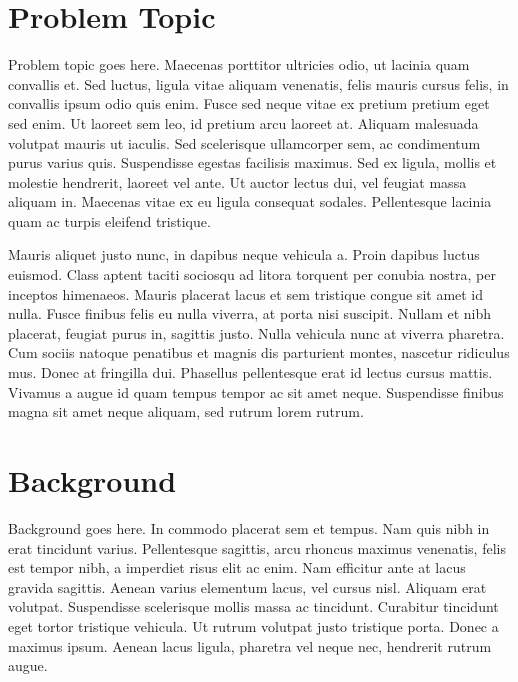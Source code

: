 \documentclass[letterpaper]{kuthesis}
\begin{document}
\section{Problem Topic}
Problem topic goes here. \cite{google}  Maecenas porttitor ultricies odio, ut lacinia quam convallis et. Sed luctus, ligula vitae aliquam venenatis, felis mauris cursus felis, in convallis ipsum odio quis enim. Fusce sed neque vitae ex pretium pretium eget sed enim. Ut laoreet sem leo, id pretium arcu laoreet at. Aliquam malesuada volutpat mauris ut iaculis. Sed scelerisque ullamcorper sem, ac condimentum purus varius quis. Suspendisse egestas facilisis maximus. Sed ex ligula, mollis et molestie hendrerit, laoreet vel ante. Ut auctor lectus dui, vel feugiat massa aliquam in. Maecenas vitae ex eu ligula consequat sodales. Pellentesque lacinia quam ac turpis eleifend tristique.
\par Mauris aliquet justo nunc, in dapibus neque vehicula a. Proin dapibus luctus euismod. Class aptent taciti sociosqu ad litora torquent per conubia nostra, per inceptos himenaeos. Mauris placerat lacus et sem tristique congue sit amet id nulla. Fusce finibus felis eu nulla viverra, at porta nisi suscipit. Nullam et nibh placerat, feugiat purus in, sagittis justo. Nulla vehicula nunc at viverra pharetra. Cum sociis natoque penatibus et magnis dis parturient montes, nascetur ridiculus mus. Donec at fringilla dui. Phasellus pellentesque erat id lectus cursus mattis. Vivamus a augue id quam tempus tempor ac sit amet neque. Suspendisse finibus magna sit amet neque aliquam, sed rutrum lorem rutrum.
\section{Background}
Background goes here. \cite{seuss}  In commodo placerat sem et tempus. Nam quis nibh in erat tincidunt varius. Pellentesque sagittis, arcu rhoncus maximus venenatis, felis est tempor nibh, a imperdiet risus elit ac enim. Nam efficitur ante at lacus gravida sagittis. Aenean varius elementum lacus, vel cursus nisl. Aliquam erat volutpat. Suspendisse scelerisque mollis massa ac tincidunt. Curabitur tincidunt eget tortor tristique vehicula. Ut rutrum volutpat justo tristique porta. Donec a maximus ipsum. Aenean lacus ligula, pharetra vel neque nec, hendrerit rutrum augue.
\end{document}
